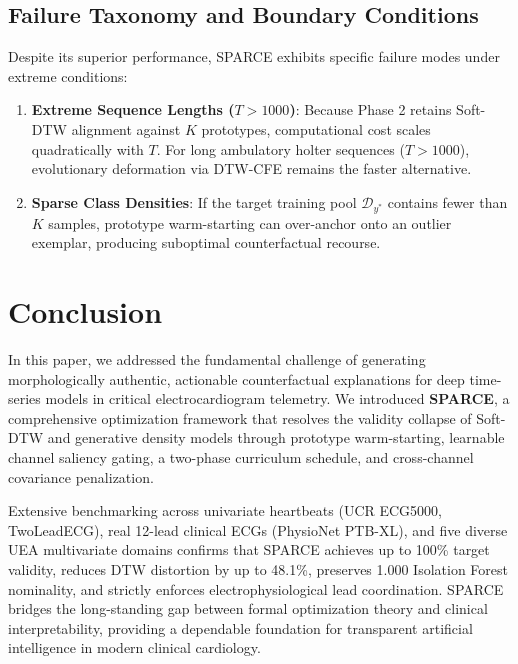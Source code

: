 \documentclass[conference]{IEEEtran}
\begin{document}
\subsection{Failure Taxonomy and Boundary Conditions}
Despite its superior performance, SPARCE exhibits specific failure modes under extreme conditions:
\begin{enumerate}
    \item \textbf{Extreme Sequence Lengths ($T > 1000$)}: Because Phase 2 retains Soft-DTW alignment against $K$ prototypes, computational cost scales quadratically with $T$. For long ambulatory holter sequences ($T > 1000$), evolutionary deformation via DTW-CFE remains the faster alternative.
    \item \textbf{Sparse Class Densities}: If the target training pool $\mathcal{D}_{y^*}$ contains fewer than $K$ samples, prototype warm-starting can over-anchor onto an outlier exemplar, producing suboptimal counterfactual recourse.
\end{enumerate}

\section{Conclusion}
In this paper, we addressed the fundamental challenge of generating morphologically authentic, actionable counterfactual explanations for deep time-series models in critical electrocardiogram telemetry. We introduced \textbf{SPARCE}, a comprehensive optimization framework that resolves the validity collapse of Soft-DTW and generative density models through prototype warm-starting, learnable channel saliency gating, a two-phase curriculum schedule, and cross-channel covariance penalization.

Extensive benchmarking across univariate heartbeats (UCR ECG5000, TwoLeadECG), real 12-lead clinical ECGs (PhysioNet PTB-XL), and five diverse UEA multivariate domains confirms that SPARCE achieves up to 100\% target validity, reduces DTW distortion by up to 48.1\%, preserves 1.000 Isolation Forest nominality, and strictly enforces electrophysiological lead coordination. SPARCE bridges the long-standing gap between formal optimization theory and clinical interpretability, providing a dependable foundation for transparent artificial intelligence in modern clinical cardiology.
\end{document}
